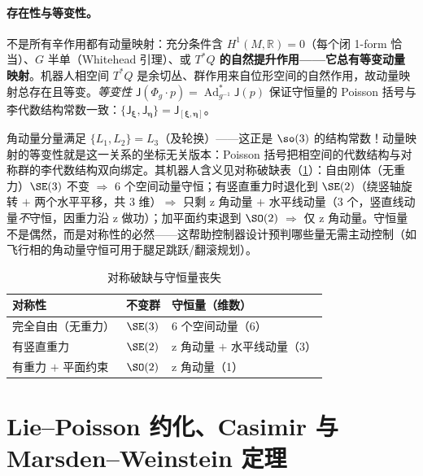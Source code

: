 \paragraph{存在性与等变性。}
不是所有辛作用都有动量映射：充分条件含 $H^1(M,\mathbb R)=0$（每个闭 1-form 恰当）、$G$ 半单（Whitehead 引理）、或\textbf{ $T^*Q$ 的自然提升作用——它总有等变动量映射}。机器人相空间 $T^*Q$ 是余切丛、群作用来自位形空间的自然作用，故动量映射总存在且等变。\emph{等变性} $\mathsf J(\Phi_g\cdot p)=\operatorname{Ad}^*_{g^{-1}}\mathsf J(p)$ 保证守恒量的 Poisson 括号与李代数结构常数一致：$\{\mathsf J_{\boldsymbol\xi},\mathsf J_{\boldsymbol\eta}\}=\mathsf J_{[\boldsymbol\xi,\boldsymbol\eta]}$。

\begin{insight}
角动量分量满足 $\{L_1,L_2\}=L_3$（及轮换）——这正是 $\so(3)$ 的结构常数！动量映射的等变性就是这一关系的坐标无关版本：Poisson 括号把相空间的代数结构与对称群的李代数结构双向绑定。其机器人含义见对称破缺表（\cref{tab:gm-noether}）：自由刚体（无重力）$\SE(3)$ 不变 $\Rightarrow$ 6 个空间动量守恒；有竖直重力时退化到 $\SE(2)$（绕竖轴旋转 $+$ 两个水平平移，共 3 维）$\Rightarrow$ 只剩 z 角动量 $+$ 水平线动量（3 个，竖直线动量\emph{不}守恒，因重力沿 z 做功）；加平面约束退到 $\SO(2)$ $\Rightarrow$ 仅 z 角动量。守恒量不是偶然，而是对称性的必然——这帮助控制器设计预判哪些量无需主动控制（如飞行相的角动量守恒可用于腿足跳跃/翻滚规划）。
\end{insight}

\begin{table}[H]\centering\small
\caption{对称破缺与守恒量丧失}
\label{tab:gm-noether}
\begin{tabular}{lll}
\toprule
对称性 & 不变群 & 守恒量（维数）\\
\midrule
完全自由（无重力）& $\SE(3)$ & 6 个空间动量（6）\\
有竖直重力 & $\SE(2)$ & z 角动量 $+$ 水平线动量（3）\\
有重力 $+$ 平面约束 & $\SO(2)$ & z 角动量（1）\\
\bottomrule
\end{tabular}
\end{table}

\section{Lie--Poisson 约化、Casimir 与 Marsden--Weinstein 定理}
\label{sec:gm-liepoisson}

